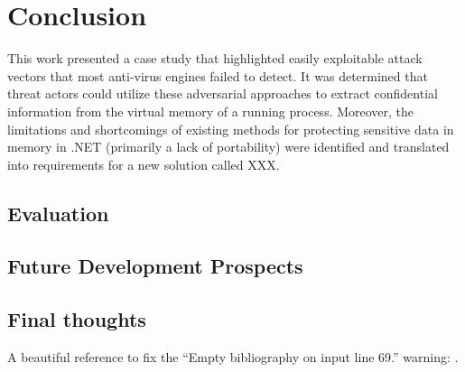 \chapter{Conclusion}
\label{ch:conclusion}

This work presented a case study that highlighted easily exploitable attack vectors that most anti-virus engines failed to detect. It was determined that threat actors could utilize these adversarial approaches to extract confidential information from the virtual memory of a running process. Moreover, the limitations and shortcomings of existing methods for protecting sensitive data in memory in .NET (primarily a lack of portability) were identified and translated into requirements for a new solution called XXX. 

\section{Evaluation}

\lorizzlelong

\section{Future Development Prospects}
\label{sec:outlook}


\lorizzleshort

\lorizzleshort

\section{Final thoughts}

\lorizzle

A beautiful reference to fix the \enquote{Empty bibliography on input line 69.} warning: \cite{CiscoBlogsMemoryDumping}. 